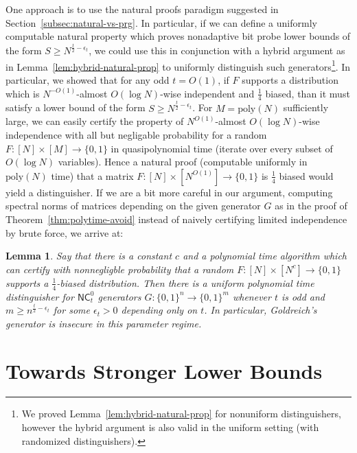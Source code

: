 \documentclass[11pt]{article}
\newtheorem{lemma}{Lemma}
\newcommand{\B}{\{0,1\}}
\newcommand{\poly}{\mathrm{poly}}
\begin{document}
One approach is to use the natural proofs paradigm suggested in Section~\ref{subsec:natural-vs-prg}. In particular, if we can define a uniformly computable natural property which proves nonadaptive bit probe lower bounds of the form $S \geq N^{\frac{t}{2} - \epsilon_t}$, we could use this in conjunction with a hybrid argument as in Lemma~\ref{lem:hybrid-natural-prop} to uniformly distinguish such generators\footnote{We proved Lemma~\ref{lem:hybrid-natural-prop} for nonuniform distinguishers, however the hybrid argument is also valid in the uniform setting (with randomized distinguishers).}.
In particular, we showed that for any odd $t=O(1)$, if $F$ supports a distribution which is $N^{-O(1)}$-almost $O(\log N)$-wise independent and $\frac{1}{4}$ biased, than it must satisfy a lower bound of the form 
$S \geq N^{\frac{t}{2} - \epsilon_t}$. For $M = \poly(N)$ sufficiently large, we can easily certify the property of $N^{O(1)}$-almost $O(\log N)$-wise independence with all but negligable probability for a random $F: [N] \times [M] \to \B$ in quasipolynomial time (iterate over every subset of $O(\log N)$ variables). Hence a natural proof (computable uniformly in $\poly(N)$ time) that a matrix $F: [N] \times [N^{O(1)}] \to \B$ is $\frac{1}{4}$ biased would yield a distinguisher. If we are a bit more careful in our argument, computing spectral norms of matrices depending on the given generator $G$ as in the proof of Theorem~\ref{thm:polytime-avoid} instead of naively certifying limited independence by brute force, we arrive at:
\begin{lemma}\label{lem:natural-eps-biased}
Say that there is a constant $c$ and a polynomial time algorithm which can certify with nonnegligble probability that a random $F:[N] \times [N^c] \to \B$ supports a $\frac{1}{4}$-biased distribution. Then there is a uniform polynomial time distinguisher for $\mathsf{NC}^0_t$ generators $G: \B^n \to \B^m$ whenever $t$ is odd and $m \geq n^{\frac{t}{2} -\epsilon_t}$ for some $\epsilon_t>0$ depending only on $t$. In particular, Goldreich's generator is insecure in this parameter regime.
\end{lemma}

\section{Towards Stronger Lower Bounds}\label{sec:connections}
\end{document}
